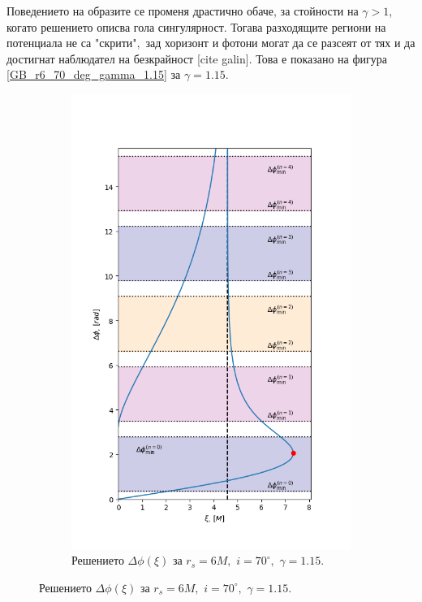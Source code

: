 Поведението на образите се променя драстично обаче, за стойности на $\gamma > 1$, когато решението описва гола сингулярност. Тогава разходящите региони на потенциала не са "скрити"$,$ зад хоризонт и фотони могат да се разсеят от тях и да достигнат наблюдател на безкрайност [cite galin]. Това е показано на фигура \ref{GB_r6_70_deg_gamma_1.15} за $\gamma = 1.15$.

\begin{figure}[!htb]
	\centering
	\begin{subfigure}{6cm}
		\hspace{0.8cm}
		\includegraphics[scale = 0.32]{GB_70_deg_r6_gamma_1.15_impact.png}
		\caption{Решението $\Delta\phi(\xi)$ за $r_s = 6M,\,\, i = 70^\circ,\,\,\gamma = 1.15$.} 

\end{subfigure}
\end{figure}
